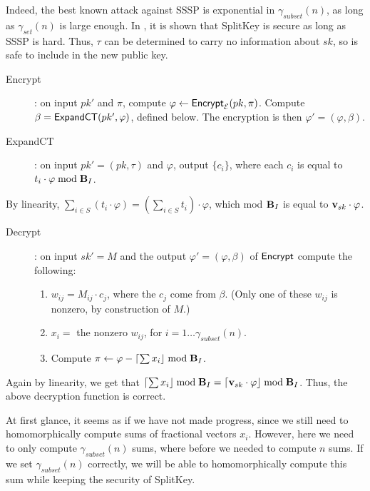  Indeed, the best known attack against SSSP is exponential in $\gamma_{subset}(n)$, as long as $\gamma_{set}(n)$ is large enough. In \cite{gentry2009fully}, it is shown that SplitKey is secure as long as SSSP is hard. Thus, $\tau$ can be determined to carry no information about $sk$, so is safe to include in the new public key.

\begin{description}
\item[Encrypt]: on input $pk'$ and $\pi$, compute $\varphi \leftarrow {\sf Encrypt}_\mathcal{E}(pk, \pi)$. Compute $\beta = {\sf ExpandCT}(pk', \varphi)$, defined below. The encryption is then $\varphi' = (\varphi, \beta)$.
\item[ExpandCT]: on input $pk' = (pk, \tau)$ and $\varphi$, output $\{c_i\}$, where each $c_i$ is equal to $t_i \cdot \varphi \bmod \textbf{B}_I$.
\end{description}

By linearity, $\sum_{i \in S} (t_i \cdot \varphi) = (\sum_{i \in S} t_i) \cdot \varphi$, which mod $\textbf{B}_I$ is equal to ${\bf v}_{sk} \cdot \varphi$.

\begin{description}
\item[Decrypt]: on input $sk' = M$ and the output $\varphi' = (\varphi, \beta)$ of ${\sf Encrypt}$ compute the following:
\begin{enumerate}
\item $w_{ij} = M_{ij} \cdot c_j$, where the $c_j$ come from $\beta$. (Only one of these $w_{ij}$ is nonzero, by construction of $M$.)
\item $x_i =$ the nonzero $w_{ij}$, for $i = 1 \dots \gamma_{subset}(n)$.
\item Compute $\pi \leftarrow \varphi - \lceil \sum x_i \rfloor \bmod \textbf{B}_I$.
\end{enumerate}
\end{description}

Again by linearity, we get that $\lceil \sum x_i \rfloor \bmod \textbf{B}_I = \lceil {\bf v}_{sk} \cdot \varphi \rfloor \bmod \textbf{B}_I$. Thus, the above decryption function is correct.

At first glance, it seems as if we have not made progress, since we still need to homomorphically compute sums of fractional vectors $x_i$. However, here we need to only compute $\gamma_{subset}(n)$ sums, where before we needed to compute $n$ sums. If we set $\gamma_{subset}(n)$ correctly, we will be able to homomorphically compute this sum while keeping the security of SplitKey.

